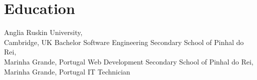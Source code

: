 \section[\faMortarBoard]{Education}
    {Anglia Ruskin University,\\ Cambridge, UK}
    {Bachelor Software Engineering}
    {}
    {Secondary School of Pinhal do Rei,\\ Marinha Grande, Portugal}
    {Web Development}
    {}
    {Secondary School of Pinhal do Rei,\\ Marinha Grande, Portugal}
    {IT Technician}
    {}
